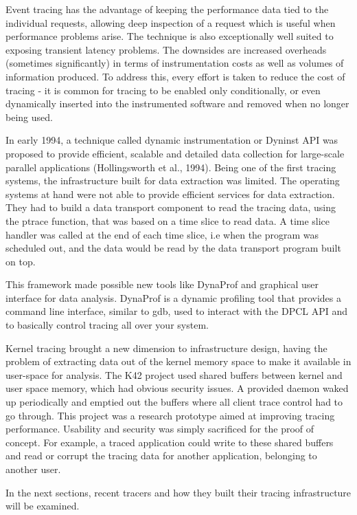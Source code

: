 Event tracing has the advantage of keeping the performance data tied to the
individual requests, allowing deep inspection of a request which is useful when
performance problems arise. The technique is also exceptionally well suited to
exposing transient latency problems. The downsides are increased overheads
(sometimes significantly) in terms of instrumentation costs as well as volumes
of information produced. To address this, every effort is taken to reduce the
cost of tracing - it is common for tracing to be enabled only conditionally, or
even dynamically inserted into the instrumented software and removed when no
longer being used.

In early 1994, a technique called dynamic instrumentation or Dyninst API
\cite{dynist} was
proposed to provide efficient, scalable and detailed data collection for
large-scale parallel applications (Hollingsworth et al., 1994). Being one of the
first tracing systems, the infrastructure built for data extraction was limited.
The operating systems at hand were not able to provide efficient services for
data extraction. They had to build a data transport component to read the
tracing data, using the ptrace function, that was based on a time slice to read
data. A time slice handler was called at the end of each time slice, i.e when
the program was scheduled out, and the data would be read by the data transport
program built on top.

This framework made possible new tools like DynaProf \cite{dynaprof} and
graphical user interface for data analysis. DynaProf is a dynamic profiling tool
that provides a command line interface, similar to gdb, used to interact with
the DPCL API and to basically control tracing all over your system.

Kernel tracing brought a new dimension to infrastructure design, having the
problem of extracting data out of the kernel memory space to make it available
in user-space for analysis. The K42 project \cite{k42}  used shared
buffers between kernel and user space memory, which had obvious security issues.
A provided daemon waked up periodically and emptied out the buffers where all
client trace control had to go through. This project was a research prototype
aimed at improving tracing performance. Usability and security was simply
sacrificed for the proof of concept. For example, a traced application could
write to these shared buffers and read or corrupt the tracing data for another
application, belonging to another user.

In the next sections, recent tracers and how they built their tracing
infrastructure will be examined.

